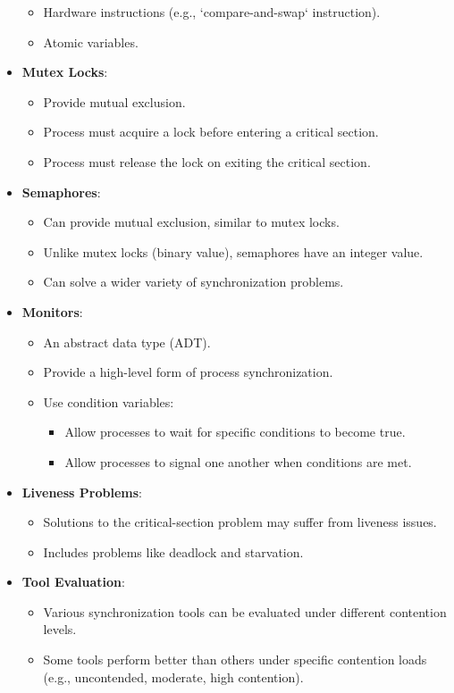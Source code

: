 \begin{itemize}
\begin{itemize}
        \item Hardware instructions (e.g., `compare-and-swap` instruction).
        \item Atomic variables.
    \end{itemize}
    \item \textbf{Mutex Locks}:
    \begin{itemize}
        \item Provide mutual exclusion.
        \item Process must acquire a lock before entering a critical section.
        \item Process must release the lock on exiting the critical section.
    \end{itemize}
    \item \textbf{Semaphores}:
    \begin{itemize}
        \item Can provide mutual exclusion, similar to mutex locks.
        \item Unlike mutex locks (binary value), semaphores have an integer value.
        \item Can solve a wider variety of synchronization problems.
    \end{itemize}
    \item \textbf{Monitors}:
    \begin{itemize}
        \item An abstract data type (ADT).
        \item Provide a high-level form of process synchronization.
        \item Use condition variables:
        \begin{itemize}
            \item Allow processes to wait for specific conditions to become true.
            \item Allow processes to signal one another when conditions are met.
        \end{itemize}
    \end{itemize}
    \item \textbf{Liveness Problems}:
    \begin{itemize}
        \item Solutions to the critical-section problem may suffer from liveness issues.
        \item Includes problems like deadlock and starvation.
    \end{itemize}
    \item \textbf{Tool Evaluation}:
    \begin{itemize}
        \item Various synchronization tools can be evaluated under different contention levels.
        \item Some tools perform better than others under specific contention loads (e.g., uncontended, moderate, high contention).
    \end{itemize}
\end{itemize}
